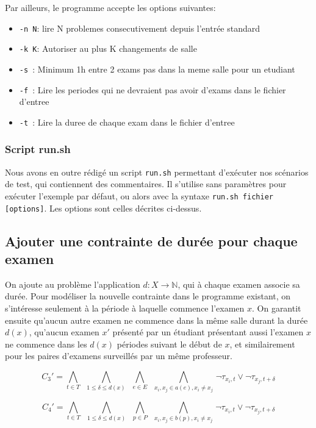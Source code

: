 \documentclass[a4paper]{article}
\begin{document}
Par ailleurs, le programme accepte les options suivantes:
\begin{itemize}
  \item \texttt{-n N}: lire N problemes consecutivement depuis l'entrée standard
  \item \texttt{-k K}: Autoriser au plus K changements de salle
  \item \texttt{-s  }: Minimum 1h entre 2 exams pas dans la meme salle pour un etudiant
  \item \texttt{-f  }: Lire les periodes qui ne devraient pas avoir d'exams dans le fichier d'entree
  \item \texttt{-t  }: Lire la duree de chaque exam dans le fichier d'entree
\end{itemize}

\subsubsection{Script run.sh}
Nous avons en outre rédigé un script \texttt{run.sh} permettant d'exécuter nos
scénarios de test, qui contiennent des commentaires. Il s'utilise sans paramètres
pour exécuter l'exemple par défaut, ou alors avec la  syntaxe \texttt{run.sh fichier [options]}.
Les options sont celles décrites ci-dessus.

\subsection{Ajouter une contrainte de durée pour chaque examen}
On ajoute au problème l'application $ d : X \rightarrow \mathbb{N} $, qui à chaque examen associe
sa durée. Pour modéliser la nouvelle contrainte dans le programme existant, on s'intéresse seulement à la période
à laquelle commence l'examen $x$. On garantit ensuite qu'aucun autre examen ne commence dans la même salle durant
la durée $d(x)$, qu'aucun examen $x'$ présenté par un étudiant présentant aussi l'examen $x$ ne commence dans les
$d(x)$ périodes suivant le début de $x$, et similairement pour les paires d'examens surveillés par un même professeur.


$$ C_3' = \bigwedge\limits_{t \in T} \,\,\,
        \bigwedge\limits_{1 \leq \delta \leq d(x)} \,\,\,
        \bigwedge\limits_{e \in E} \,\,\,
        \bigwedge\limits_{x_i, x_j \in a(e), x_i \neq x_j} \,
        \lnot \tau_{x_i,t} \lor \lnot \tau_{x_j,t+\delta}$$

$$ C_4' = \bigwedge\limits_{t \in T} \,\,\,
        \bigwedge\limits_{1 \leq \delta \leq d(x)} \,\,\,
        \bigwedge\limits_{p \in P} \,\,\,
        \bigwedge\limits_{x_i, x_j \in b(p), x_i \neq x_j} \,
        \lnot \tau_{x_i,t} \lor \lnot \tau_{x_j,t+\delta}$$
\end{document}
